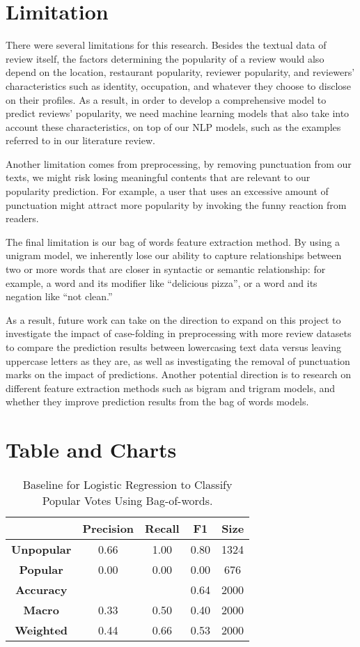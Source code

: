 \documentclass[11pt,a4paper]{article}
\begin{document}
\section{Limitation}
There were several limitations for this research. Besides the textual data of review itself, the factors determining the popularity of a review would also depend on the location, restaurant popularity, reviewer popularity, and reviewers’ characteristics such as identity, occupation, and whatever they choose to disclose on their profiles. As a result, in order to develop a comprehensive model to predict reviews’ popularity, we need machine learning models that also take into account these characteristics, on top of our NLP models, such as the examples referred to in our literature review.

Another limitation comes from preprocessing, by removing punctuation from our texts, we might risk losing meaningful contents that are relevant to our popularity prediction. For example, a user that uses an excessive amount of punctuation might attract more popularity by invoking the funny reaction from readers.

The final limitation is our bag of words feature extraction method. By using a unigram model, we inherently lose our ability to capture relationships between two or more words that are closer in syntactic or semantic relationship: for example, a word and its modifier like “delicious pizza”, or a word and its negation like “not clean.”

As a result, future work can take on the direction to expand on this project to investigate the impact of case-folding in preprocessing with more review datasets to compare the prediction results between lowercasing text data versus leaving uppercase letters as they are, as well as investigating the removal of punctuation marks on the impact of predictions. Another potential direction is to research on different feature extraction methods such as bigram and trigram models, and whether they improve prediction results from the bag of words models.

\clearpage
\section{Table and Charts}

\begin{table}[h!]
\centering
 \begin{tabular}{|c c c c c|} 
 \hline
 & {\bf Precision} & {\bf Recall} & {\bf F1} & {\bf Size} \\ [0.5ex] 
 \hline\hline
 {\bf Unpopular } & 0.66 & 1.00 & 0.80 & 1324\\ 
 {\bf Popular } & 0.00 & 0.00 & 0.00 & 676 \\
 {\bf Accuracy } & & & 0.64 & 2000 \\
 {\bf Macro } & 0.33 & 0.50 & 0.40 & 2000 \\
 {\bf Weighted } & 0.44 & 0.66 & 0.53 & 2000\\ [1ex] 
 \hline
 \end{tabular}
 \caption{\label{tab:Table 1}Baseline for Logistic Regression to Classify Popular Votes Using Bag-of-words.}
\end{table}
\end{document}
